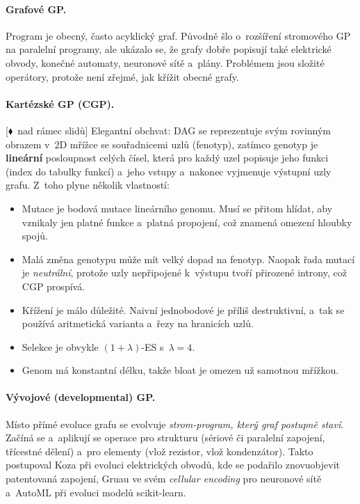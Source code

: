 \documentclass[11pt,a4paper]{article}
\theoremstyle{definition}
\newcommand{\mimo}{\textcolor{markcol}{\textsf{\footnotesize[$\blacklozenge$~nad rámec slidů]}}}
\begin{document}
\paragraph{Grafové GP.} Program je obecný, často acyklický graf. Původně šlo
o~rozšíření stromového GP na paralelní programy, ale ukázalo se, že grafy dobře popisují
také elektrické obvody, konečné automaty, neuronové sítě a~plány. Problémem jsou složité
operátory, protože není zřejmé, jak křížit obecné grafy.

\paragraph{Kartézské GP (CGP).} \mimo{} Elegantní obchvat: DAG se reprezentuje svým
rovinným obrazem v~2D mřížce se souřadnicemi uzlů (fenotyp), zatímco genotyp je
\textbf{lineární} posloupnost celých čísel, která pro každý uzel popisuje jeho funkci
(index do tabulky funkcí) a~jeho vstupy a~nakonec vyjmenuje výstupní uzly grafu. Z~toho
plyne několik vlastností:
\begin{itemize}
\item Mutace je bodová mutace lineárního genomu. Musí se přitom hlídat, aby vznikaly jen
  platné funkce a~platná propojení, což znamená omezení hloubky spojů.
\item Malá změna genotypu může mít velký dopad na fenotyp. Naopak řada mutací je
  \emph{neutrální}, protože uzly nepřipojené k~výstupu tvoří přirozené introny, což
  CGP prospívá.
\item Křížení je málo důležité. Naivní jednobodové je příliš destruktivní, a~tak se
  používá aritmetická varianta a~řezy na hranicích uzlů.
\item Selekce je obvykle $(1+\lambda)$-ES s~$\lambda = 4$.
\item Genom má konstantní délku, takže bloat je omezen už samotnou mřížkou.
\end{itemize}

\paragraph{Vývojové (developmental) GP.} Místo přímé evoluce grafu se evolvuje
\emph{strom-program, který graf postupně staví}. Začíná se  a~aplikují se
operace pro strukturu (sériové či paralelní zapojení, třícestné dělení) a~pro elementy
(vlož rezistor, vlož kondenzátor). Takto postupoval Koza při evoluci elektrických
obvodů, kde se podařilo znovuobjevit patentovaná zapojení, Gruau ve svém
\emph{cellular encoding} pro neuronové sítě a~AutoML při evoluci modelů scikit-learn.
\end{document}
